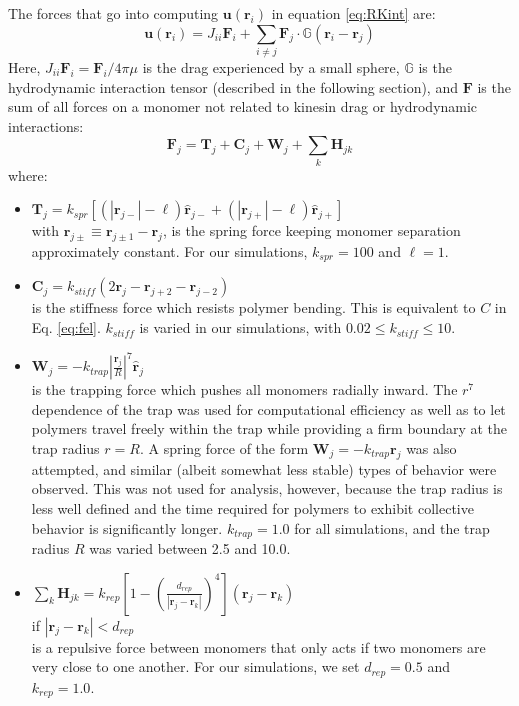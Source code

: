 \documentclass[11pt]{ucthesis}
\begin{document}
The forces that go into computing $\mathbf{u}(\mathbf{r}_i)$ in equation \ref{eq:RKint} are:
\begin{equation}
\label{eq:uri}
\mathbf{u}(\mathbf{r}_i) = J_{ii}\mathbf{F}_i + \sum_{i\neq j}\mathbf{F}_j\cdot\mathbb{G}(\mathbf{r}_i - \mathbf{r}_j)
\end{equation}
Here, $J_{ii}\mathbf{F}_i = \mathbf{F}_i/4\pi\mu$ is the drag experienced by a small sphere, $\mathbb{G}$ is the hydrodynamic interaction tensor (described in the following section), and $\mathbf{F}$ is the sum of all forces on a monomer not related to kinesin drag or hydrodynamic interactions:
\begin{equation}
\label{eq:Fbreakdown}
\mathbf{F}_j = \mathbf{T}_j + \mathbf{C}_j + \mathbf{W}_j + \sum_k\mathbf{H}_{jk}
\end{equation}
where:
\begin{itemize}
\item $\mathbf{T}_j = k_{spr}\left[\left(|\mathbf{r}_{j-}|-\ell\right)\hat{\mathbf{r}}_{j-} + \left(|\mathbf{r}_{j+}|-\ell\right)\hat{\mathbf{r}}_{j+} \right]$\\
with $\mathbf{r}_{j\pm}\equiv \mathbf{r}_{j\pm 1} - \mathbf{r}_j$, is the spring force keeping monomer separation approximately constant. For our simulations, $k_{spr}=100$ and $\ell=1$.
\item $\mathbf{C}_j = k_{stiff}\left(2\textbf{r}_j - \textbf{r}_{j+2} - \textbf{r}_{j-2}\right)$\\
is the stiffness force which resists polymer bending. This is equivalent to $C$ in Eq. \ref{eq:fel}. $k_{stiff}$ is varied in our simulations, with $0.02 \leq k_{stiff} \leq 10$.
\item $\mathbf{W}_{j} = -k_{trap} \left|\frac{\mathbf{r}_j}{R}\right|^7\hat{\mathbf{r}}_j$\\
is the trapping force which pushes all monomers radially inward. The $r^7$ dependence of the trap was used for computational efficiency as well as to let polymers travel freely within the trap while providing a firm boundary at the trap radius $r=R$. A spring force of the form $\mathbf{W}_{j} = -k_{trap}\mathbf{r}_j$ was also attempted, and similar (albeit somewhat less stable) types of behavior were observed. This was not used for analysis, however, because the trap radius is less well defined and the time required for polymers to exhibit collective behavior is significantly longer. $k_{trap} = 1.0$ for all simulations, and the trap radius $R$ was varied between 2.5 and 10.0.
\item $\sum_k\mathbf{H}_{jk} = k_{rep}\left[1-\left(\frac{d_{rep}}{|\mathbf{r}_j - \mathbf{r}_k|}\right)^4\right]\left(\mathbf{r}_j - \mathbf{r}_k\right)$\\
\phantom{.}\hfill if $|\mathbf{r}_j-\mathbf{r}_k| < d_{rep}$\\
is a repulsive force between monomers that only acts if two monomers are very close to one another. For our simulations, we set $d_{rep}=0.5$ and $k_{rep} = 1.0$.
\end{itemize}
\end{document}
